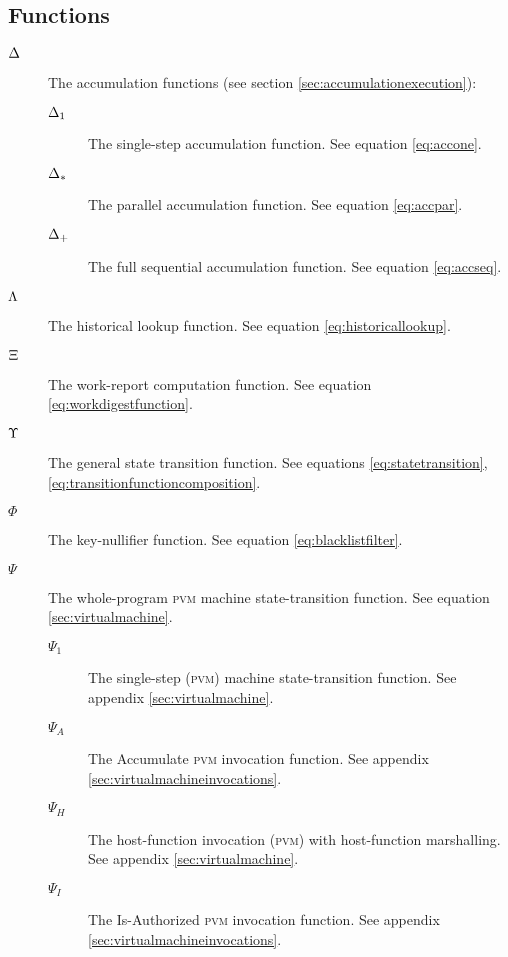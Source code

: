 \subsection{Functions}

\begin{description}
  \item[$\Delta$] The accumulation functions (see section \ref{sec:accumulationexecution}): 
  \begin{description}
    \item[$\Delta_1$] The single-step accumulation function. See equation \ref{eq:accone}.
    \item[$\Delta_*$] The parallel accumulation function. See equation \ref{eq:accpar}.
    \item[$\Delta_+$] The full sequential accumulation function. See equation \ref{eq:accseq}.
  \end{description}
  \item[$\Lambda$] The historical lookup function. See equation \ref{eq:historicallookup}.
  \item[$\Xi$] The work-report computation function. See equation \ref{eq:workdigestfunction}.
  \item[$\Upsilon$] The general state transition function. See equations \ref{eq:statetransition}, \ref{eq:transitionfunctioncomposition}.
  \item[$\Phi$] The key-nullifier function. See equation \ref{eq:blacklistfilter}.
  \item[$\Psi$] The whole-program \textsc{pvm} machine state-transition function. See equation \ref{sec:virtualmachine}.
  \begin{description}
    \item[$\Psi_1$] The single-step (\textsc{pvm}) machine state-transition function. See appendix \ref{sec:virtualmachine}.
    \item[$\Psi_A$] The Accumulate \textsc{pvm} invocation function. See appendix \ref{sec:virtualmachineinvocations}.
    \item[$\Psi_H$] The host-function invocation (\textsc{pvm}) with host-function marshalling. See appendix \ref{sec:virtualmachine}.
    \item[$\Psi_I$] The Is-Authorized \textsc{pvm} invocation function. See appendix \ref{sec:virtualmachineinvocations}.

\end{description}
\end{description}
